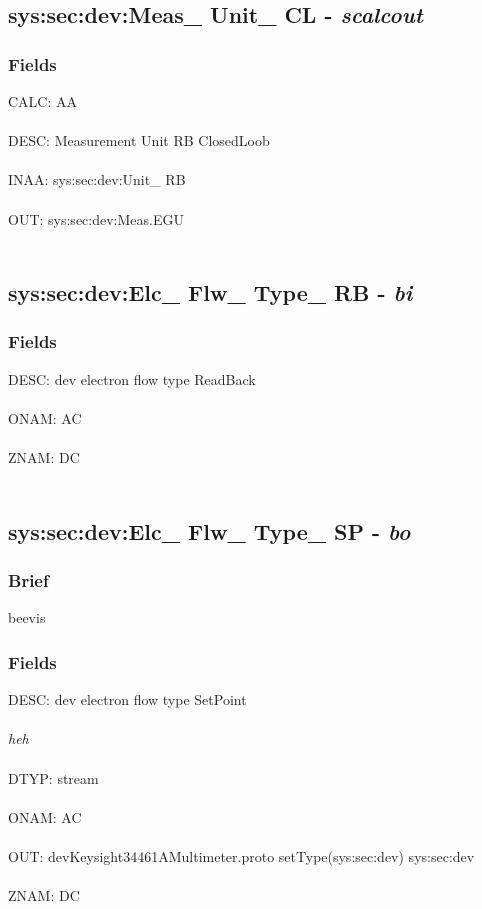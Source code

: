 \documentclass[12pt]{article}
\begin{document}
\subsection{sys:sec:dev:Meas\_ Unit\_ CL - \textit{scalcout}}
\subsubsection{Fields}
CALC: AA\\\\ DESC: Measurement Unit RB ClosedLoob\\\\ INAA: sys:sec:dev:Unit\_ RB\\\\ OUT: sys:sec:dev:Meas.EGU\\\\ \newpage
\subsection{sys:sec:dev:Elc\_ Flw\_ Type\_ RB - \textit{bi}}
\subsubsection{Fields}
DESC: dev electron flow type ReadBack\\\\ ONAM: AC\\\\ ZNAM: DC\\\\ \newpage
\subsection{sys:sec:dev:Elc\_ Flw\_ Type\_ SP - \textit{bo}}
\subsubsection{Brief}
beevis
\subsubsection{Fields}
DESC: dev electron flow type SetPoint\\\\ \textit{heh}\\\\ 
DTYP: stream\\\\ ONAM: AC\\\\ OUT: devKeysight34461AMultimeter.proto setType(sys:sec:dev) sys:sec:dev\\\\ ZNAM: DC\\\\ 
\end{document}
